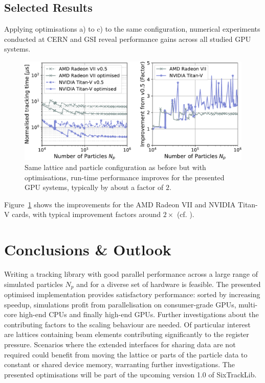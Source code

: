 \documentclass[a4paper,
               refpage,       %
               keeplastbox,   %
               ]{jacow}
\begin{document}
\subsection{Selected Results}
Applying optimisations a) to c) to the same configuration, numerical experiments conducted at CERN and GSI reveal performance gains across all studied GPU systems.
\begin{figure}[h!bt]
    \centering 
    \includegraphics*[width=\columnwidth]{THPAB190_f5}
    \caption{Same lattice and particle configuration as before but with optimisations, run-time performance improves for the presented GPU systems, typically by about a factor of $2$.}
    \label{fig:optimised_performance}
\end{figure}
Figure~\ref{fig:optimised_performance} shows the improvements for the AMD Radeon VII and NVIDIA Titan-V cards, with typical improvement factors around $2\times$ (cf. \cite{data-2021}).

\section{Conclusions \& Outlook}
Writing a tracking library with good parallel performance across a large range of simulated particles $N_{p}$ and for a diverse set of hardware is feasible. The presented optimised implementation provides satisfactory performance:
sorted by increasing speedup, simulations profit from parallelisation on consumer-grade GPUs, multi-core high-end CPUs and finally high-end GPUs. 
Further investigations about the contributing factors to the scaling behaviour are needed. Of particular interest are lattices containing beam elements contributing significantly to the register pressure. Scenarios where the extended interfaces for sharing data are not required could benefit from moving the lattice or parts of the particle data to constant or shared device memory, warranting further investigations. The presented optimisations will be part of the upcoming version 1.0 of SixTrackLib.
\end{document}
